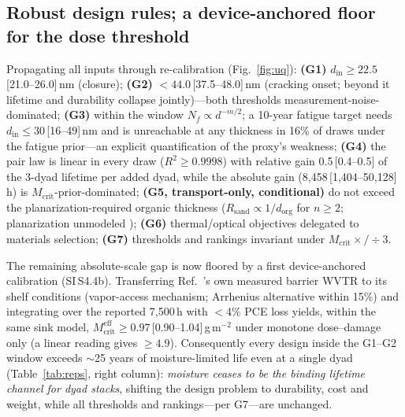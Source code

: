\documentclass[11pt]{article}
\newcommand{\dorg}{d_{\mathrm{org}}}
\newcommand{\din}{d_{\mathrm{in}}}
\begin{document}
\subsection{Robust design rules; a device-anchored floor for the dose threshold}\label{sec:rules}
Propagating all inputs through re-calibration (Fig.~\ref{fig:uq}): \textbf{(G1)} $\din\ge22.5$\,[21.0--26.0]\,nm (closure); \textbf{(G2)} $<44.0$\,[37.5--48.0]\,nm (cracking onset; beyond it lifetime and durability collapse jointly)---both thresholds measurement-noise-dominated; \textbf{(G3)} within the window $N_f\propto d^{-m/2}$; a 10-year fatigue target needs $\din\le30$\,[16--49]\,nm and is unreachable at any thickness in 16\% of draws under the fatigue prior---an explicit quantification of the proxy's weakness; \textbf{(G4)} the pair law is linear in every draw ($R^2\ge0.9998$) with relative gain 0.5\,[0.4--0.5] of the 3-dyad lifetime per added dyad, while the absolute gain (8{,}458\,[1{,}404--50{,}128]\,h) is $M_{\mathrm{crit}}$-prior-dominated; \textbf{(G5, transport-only, conditional)} do not exceed the planarization-required organic thickness ($R_{\mathrm{sand}}\propto1/\dorg$ for $n\ge2$; planarization unmodeled \cite{coclite2012}); \textbf{(G6)} thermal/optical objectives delegated to materials selection; \textbf{(G7)} thresholds and rankings invariant under $M_{\mathrm{crit}}\times/\div3$.

The remaining absolute-scale gap is now floored by a first device-anchored calibration (SI\,S4.4b). Transferring Ref.~\cite{choi2018}'s own measured barrier WVTR to its shelf conditions (vapor-access mechanism; Arrhenius alternative within 15\%) and integrating over the reported 7{,}500\,h with $<$4\% PCE loss yields, within the same sink model, $M_{\mathrm{crit}}^{\mathrm{eff}}\ge0.97$\,[0.90--1.04]\,g\,m$^{-2}$ under monotone dose--damage only (a linear reading gives $\ge4.9$). Consequently every design inside the G1--G2 window exceeds $\sim$25 years of moisture-limited life even at a single dyad (Table~\ref{tab:reps}, right column): \emph{moisture ceases to be the binding lifetime channel for dyad stacks}, shifting the design problem to durability, cost and weight, while all thresholds and rankings---per G7---are unchanged.
\end{document}
